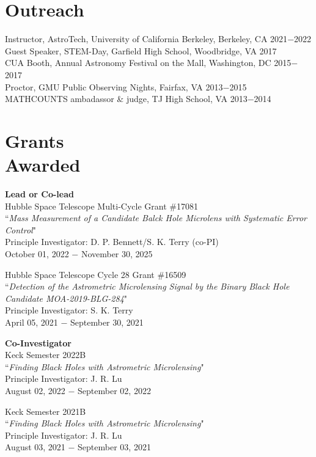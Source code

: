 \documentclass[margin,line]{cv}
\begin{document}
\begin{resume}
\section{\sc Outreach}
Instructor, AstroTech, University of California Berkeley, Berkeley, CA \hfill 2021$-$2022 \\
Guest Speaker, STEM-Day, Garfield High School, Woodbridge, VA \hfill 2017 \\
CUA Booth, Annual Astronomy Festival on the Mall, Washington, DC \hfill 2015$-$2017 \\
Proctor, GMU Public Observing Nights, Fairfax, VA \hfill 2013$-$2015 \\
MATHCOUNTS ambadassor \& judge, TJ High School, VA \hfill 2013$-$2014 \\

\section{\sc Grants \\ Awarded}
\textbf{Lead or Co-lead} \\
Hubble Space Telescope Multi-Cycle Grant \#17081 \\
``\textit{Mass Measurement of a Candidate Balck Hole Microlens with Systematic Error Control}" \\
Principle Investigator: D. P. Bennett/S. K. Terry (co-PI) \\
October 01, 2022 $-$ November 30, 2025

Hubble Space Telescope Cycle 28 Grant \#16509 \\
``\textit{Detection of the Astrometric Microlensing Signal by the Binary Black Hole Candidate MOA-2019-BLG-284}" \\
Principle Investigator: S. K. Terry \\
April 05, 2021 $-$ September 30, 2021

\textbf{Co-Investigator} \\
Keck Semester 2022B \\
``\textit{Finding Black Holes with Astrometric Microlensing}" \\
Principle Investigator: J. R. Lu\\
August 02, 2022 $-$ September 02, 2022

Keck Semester 2021B \\
``\textit{Finding Black Holes with Astrometric Microlensing}" \\
Principle Investigator: J. R. Lu\\
August 03, 2021 $-$ September 03, 2021


\end{resume}
\end{document}
